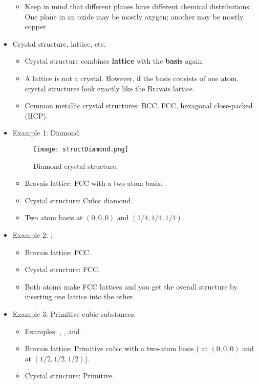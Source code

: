 \documentclass[../notes.tex]{subfiles}
\begin{document}
\begin{itemize}
\begin{itemize}
        \item Keep in mind that different planes have different chemical distributions. One plane in an oxide may be mostly oxygen; another may be mostly copper.
    \end{itemize}
    \item Crystal structure, lattice, etc.
    \begin{itemize}
        \item Crystal structure combines \textbf{lattice} with the \textbf{basis} again.
        \item A lattice is not a crystal. However, if the basis consists of one atom, crystal structures look exactly like the Bravais lattice.
        \item Common metallic crystal structures: BCC, FCC, hexagonal close-packed (HCP).
    \end{itemize}
    \item Example 1: Diamond.
    \begin{figure}[h!]
        \centering
        \texttt{[image: structDiamond.png]}
        \caption{Diamond crystal structure.}
        \label{fig:structDiamond}
    \end{figure}
    \begin{itemize}
        \item Bravais lattice: FCC with a two-atom basis.
        \item Crystal structure: Cubic diamond.
        \item Two atom basis at $(0,0,0)$ and $(1/4,1/4,1/4)$.
    \end{itemize}
    \item Example 2: .
    \begin{itemize}
        \item Bravais lattice: FCC.
        \item Crystal structure: FCC.
        \item Both atoms make FCC lattices and you get the overall structure by inserting one lattice into the other.
    \end{itemize}
    \item Example 3: Primitive cubic substances.
    \begin{itemize}
        \item Examples: , , and .
        \item Bravais lattice: Primitive cubic with a two-atom basis ( at $(0,0,0)$ and  at $(1/2,1/2,1/2)$).
        \item Crystal structure: Primitive.

\end{itemize}
\end{itemize}
\end{document}
